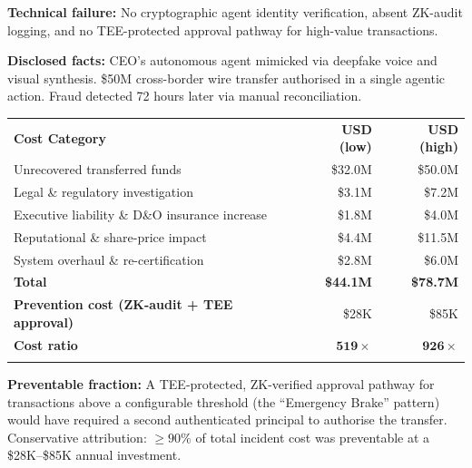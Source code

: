 \begin{tcolorbox}[casebox,
  title={Financial Autopsy 2: Deepfake-Enabled Corporate Fraud}]

\textbf{Technical failure:} No cryptographic agent identity
verification, absent ZK-audit logging, and no TEE-protected
approval pathway for high-value transactions.

\textbf{Disclosed facts:} CEO's autonomous agent mimicked via
deepfake voice and visual synthesis.
\$50M cross-border wire transfer authorised in a single
agentic action.
Fraud detected 72 hours later via manual reconciliation.

\medskip
\begin{tabular}{@{}lrr@{}}
\hline\noalign{\smallskip}
\textbf{Cost Category} & \textbf{USD (low)} & \textbf{USD (high)} \\
\noalign{\smallskip}\svhline\noalign{\smallskip}
Unrecovered transferred funds & \$32.0M & \$50.0M \\
Legal \& regulatory investigation & \$3.1M & \$7.2M \\
Executive liability \& D\&O insurance increase & \$1.8M & \$4.0M \\
Reputational \& share-price impact & \$4.4M & \$11.5M \\
System overhaul \& re-certification & \$2.8M & \$6.0M \\
\noalign{\smallskip}\hline\noalign{\smallskip}
\textbf{Total} & \textbf{\$44.1M} & \textbf{\$78.7M} \\
\noalign{\smallskip}\hline\noalign{\smallskip}
\textbf{Prevention cost (ZK-audit + TEE approval)} & \$28K & \$85K \\
\textbf{Cost ratio} & $\mathbf{519\times}$ & $\mathbf{926\times}$ \\
\noalign{\smallskip}\hline\noalign{\smallskip}
\end{tabular}

\medskip
\textbf{Preventable fraction:}
A TEE-protected, ZK-verified approval pathway for transactions
above a configurable threshold (the ``Emergency Brake'' pattern)
would have required a second authenticated principal to
authorise the transfer.
Conservative attribution: $\geq 90\%$ of total incident cost
was preventable at a \$28K--\$85K annual investment.
\end{tcolorbox}

